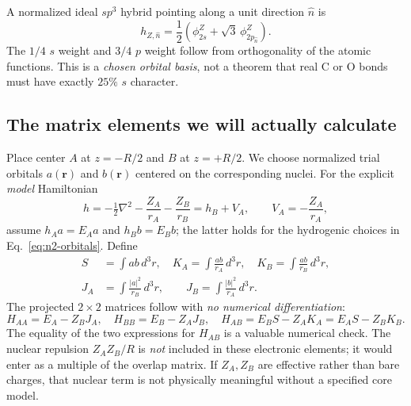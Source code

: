 \documentclass[11pt,letterpaper]{article}
\begin{document}
A normalized ideal $sp^3$ hybrid pointing along a unit direction $\hat n$ is
\begin{equation}\label{eq:sp3}
\boxed{h_{Z,\hat n}=\frac12\left(\phi_{2s}^{Z}+\sqrt3\,\phi_{2p_{\hat n}}^{Z}\right).}
\end{equation}
The $1/4$ $s$ weight and $3/4$ $p$ weight follow from orthogonality of the atomic functions. This is a \emph{chosen orbital basis}, not a theorem that real C or O bonds must have exactly $25\%$ $s$ character.

\subsection{The matrix elements we will actually calculate}
Place center $A$ at $z=-R/2$ and $B$ at $z=+R/2$. We choose normalized trial orbitals $a(\mathbf r)$ and $b(\mathbf r)$ centered on the corresponding nuclei. For the explicit \emph{model} Hamiltonian
\begin{equation}\label{eq:charge-H}
h=-\tfrac12\nabla^2-\frac{Z_A}{r_A}-\frac{Z_B}{r_B}=h_B+V_A,\qquad V_A=-\frac{Z_A}{r_A},
\end{equation}
assume $h_Aa=E_Aa$ and $h_Bb=E_Bb$; the latter holds for the hydrogenic choices in Eq.~\eqref{eq:n2-orbitals}. Define
\begin{equation}\label{eq:integral-defs}
\begin{aligned}
S&=\int a b\,d^3r,\quad K_A=\int\frac{ab}{r_A}\,d^3r,\quad K_B=\int\frac{ab}{r_B}\,d^3r,\\
J_A&=\int\frac{|a|^2}{r_B}\,d^3r,\qquad J_B=\int\frac{|b|^2}{r_A}\,d^3r.
\end{aligned}
\end{equation}
The projected $2\times2$ matrices follow with \emph{no numerical differentiation}:
\begin{equation}\label{eq:general-hab}
\boxed{H_{AA}=E_A-Z_BJ_A,\quad H_{BB}=E_B-Z_AJ_B,\quad
H_{AB}=E_BS-Z_AK_A=E_AS-Z_BK_B.}
\end{equation}
The equality of the two expressions for $H_{AB}$ is a valuable numerical check. The nuclear repulsion $Z_AZ_B/R$ is \emph{not} included in these electronic elements; it would enter as a multiple of the overlap matrix. If $Z_A,Z_B$ are effective rather than bare charges, that nuclear term is not physically meaningful without a specified core model.
\end{document}
